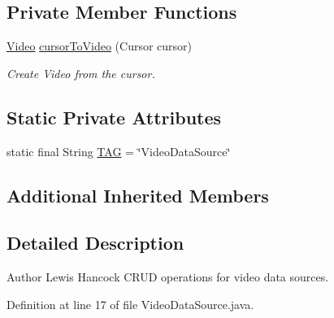 \subsection*{Private Member Functions}
\begin{DoxyCompactItemize}
\item 
\hyperlink{classuk_1_1ac_1_1swan_1_1digitaltrails_1_1components_1_1_video}{Video} \hyperlink{classuk_1_1ac_1_1swan_1_1digitaltrails_1_1database_1_1_video_data_source_a1a28b35e712e9295cbd7f4c6ddd9c3ea}{cursor\+To\+Video} (Cursor cursor)
\begin{DoxyCompactList}\small\item\em Create Video from the cursor. \end{DoxyCompactList}\end{DoxyCompactItemize}
\subsection*{Static Private Attributes}
\begin{DoxyCompactItemize}
\item 
static final String \hyperlink{classuk_1_1ac_1_1swan_1_1digitaltrails_1_1database_1_1_video_data_source_ac59703db55c1abb45784aaf3cc01d59f}{T\+A\+G} = \char`\"{}Video\+Data\+Source\char`\"{}
\end{DoxyCompactItemize}
\subsection*{Additional Inherited Members}


\subsection{Detailed Description}
\begin{DoxyAuthor}{Author}
Lewis Hancock C\+R\+U\+D operations for video data sources. 
\end{DoxyAuthor}


Definition at line 17 of file Video\+Data\+Source.\+java.




